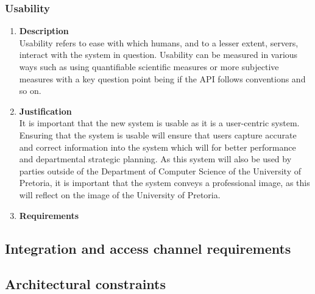 \documentclass[a4paper,10pt]{article}
\begin{document}
	\subsubsection{Usability}
		\begin{enumerate}
			\item \textbf{Description} \\
				Usability refers to ease with which humans, and to a lesser extent, servers, interact with the system in question. Usability can be measured in various ways such as using quantifiable scientific measures or more subjective measures with a key question point being if the API follows conventions and so on.

			\item \textbf{Justification} \\
				It is important that the new system is usable as it is a user-centric system. Ensuring that the system is usable will ensure that users capture accurate and correct information into the system which will for better performance and departmental strategic planning. As this system will also be used by parties outside of the Department of Computer Science of the University of Pretoria, it is important that the system conveys a professional image, as this will reflect on the image of the University of Pretoria. 

			\item \textbf{Requirements}\\
		\end{enumerate}

\subsection{Integration and access channel requirements}
\subsection{Architectural constraints}
\end{document}
